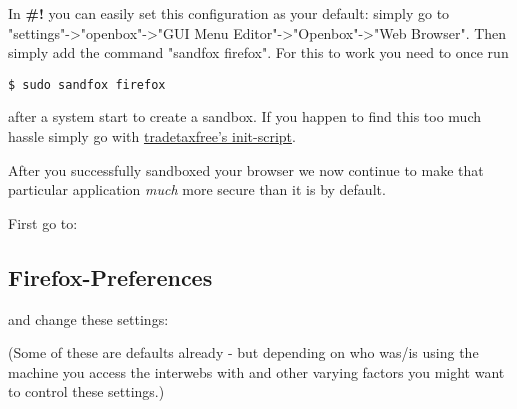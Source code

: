 \documentclass{article}
\begin{document}
 In
\textbf{\#!} you can easily set this configuration as your default: simply go to "settings"->"openbox"->"GUI Menu Editor"->"Openbox"->"Web Browser". Then simply add the command "sandfox firefox". For this to work you need to once run 
\begin{lstlisting}
$ sudo sandfox firefox
\end{lstlisting}



 after a system start to create a sandbox. If you happen to find this too much hassle simply go with \href{http://crunchbang.org/forums/viewtopic.php?id=20868}{tradetaxfree's init-script}.


 After you successfully sandboxed your browser we now continue to make that particular application \emph{much} more secure than it is by default. 


 First go to: 
\subsection{Firefox-Preferences}


 and change these settings: 


 (Some of these are defaults already - but depending on who was/is using the machine you access the interwebs with and other varying factors you might want to control these settings.)
\end{document}
